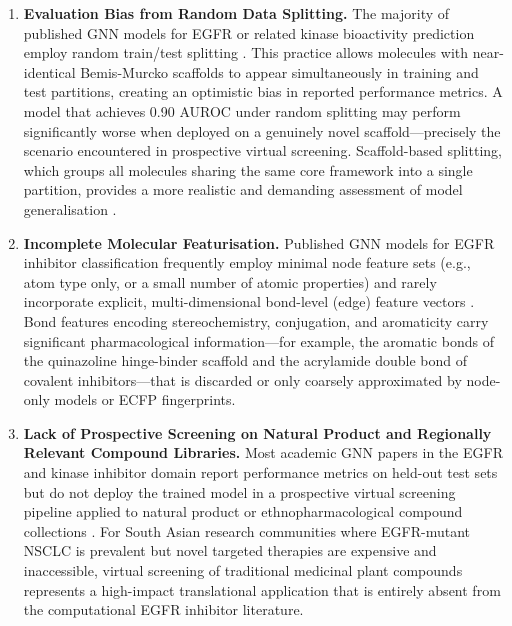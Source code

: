 \begin{enumerate}
    \item \textbf{Evaluation Bias from Random Data Splitting.} The majority of
    published GNN models for EGFR or related kinase bioactivity prediction employ
    random train/test splitting \parencite{jiang2021gnn, malik2025deepegfr}.
    This practice allows molecules with near-identical Bemis-Murcko scaffolds to
    appear simultaneously in training and test partitions, creating an optimistic
    bias in reported performance metrics. A model that achieves 0.90 AUROC under
    random splitting may perform significantly worse when deployed on a genuinely
    novel scaffold---precisely the scenario encountered in prospective virtual
    screening. Scaffold-based splitting, which groups all molecules sharing the
    same core framework into a single partition, provides a more realistic and
    demanding assessment of model generalisation \parencite{wu2018moleculenet}.

    \item \textbf{Incomplete Molecular Featurisation.} Published GNN models for
    EGFR inhibitor classification frequently employ minimal node feature sets
    (e.g., atom type only, or a small number of atomic properties) and rarely
    incorporate explicit, multi-dimensional bond-level (edge) feature vectors
    \parencite{malik2025deepegfr}. Bond features encoding stereochemistry,
    conjugation, and aromaticity carry significant pharmacological information---for
    example, the aromatic bonds of the quinazoline hinge-binder scaffold and the
    acrylamide double bond of covalent inhibitors---that is discarded or only
    coarsely approximated by node-only models or ECFP fingerprints.

    \item \textbf{Lack of Prospective Screening on Natural Product and Regionally
    Relevant Compound Libraries.} Most academic GNN papers in the EGFR and kinase
    inhibitor domain report performance metrics on held-out test sets but do not
    deploy the trained model in a prospective virtual screening pipeline applied
    to natural product or ethnopharmacological compound collections
    \parencite{sun2021gcn, malik2025deepegfr}. For South Asian research communities
    where EGFR-mutant NSCLC is prevalent but novel targeted therapies are expensive
    and inaccessible, virtual screening of traditional medicinal plant compounds
    represents a high-impact translational application that is entirely absent from
    the computational EGFR inhibitor literature.
\end{enumerate}

